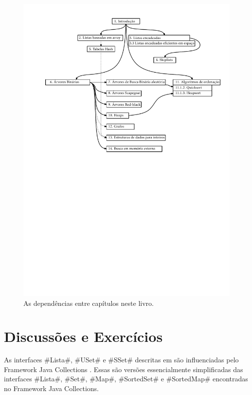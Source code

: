 	\begin{figure}
		\begin{center}
			\includegraphics[width=\ScaleIfNeeded]{figs/dependencies}
		\end{center}
		\caption{As dependências entre capítulos neste livro.}
	\end{figure}
	
	\section{Discussões e Exercícios}
	
	As interfaces #Lista#, #USet# e #SSet# descritas em  são 
	influenciadas pelo Framework Java Collections  
	\cite{oracle_collections}.
	Essas são versões essencialmente simplificadas das interfaces #Lista#, #Set#, #Map#, 
	#SortedSet# e #SortedMap# encontradas no Framework Java Collections. 
	
